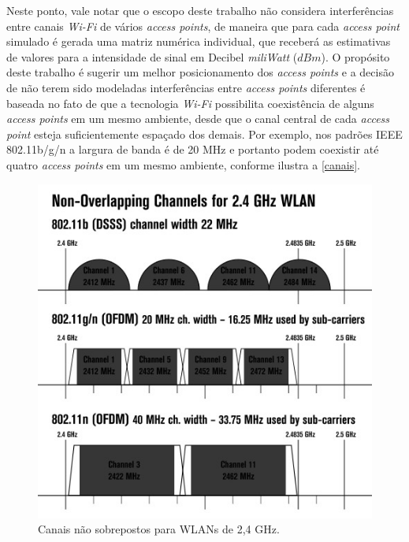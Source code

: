 \documentclass[
	12pt,				%
	twoside,			%
	a4paper,			%
	english,			%
	french,				%
	spanish,			%
	brazil				%
	]{abntex2}
\begin{document}
Neste ponto, vale notar que o escopo deste trabalho não considera
interferências entre canais \emph{Wi-Fi} de vários \emph{access points},
de maneira que para cada \emph{access point} simulado é gerada uma
matriz numérica individual, que receberá as estimativas de valores para
a intensidade de sinal em Decibel \emph{miliWatt} (\(dBm\)). O propósito
deste trabalho é sugerir um melhor posicionamento dos \emph{access
points} e a decisão de não terem sido modeladas interferências entre
\emph{access points} diferentes é baseada no fato de que a tecnologia
\emph{Wi-Fi} possibilita coexistência de alguns \emph{access points} em
um mesmo ambiente, desde que o canal central de cada \emph{access point}
esteja suficientemente espaçado dos demais. Por exemplo, nos padrões
IEEE 802.11b/g/n a largura de banda é de 20 MHz e portanto podem
coexistir até quatro \emph{access points} em um mesmo ambiente, conforme
ilustra a \autoref{canais}.

\begin{figure}[!htb]
    \caption{\label{canais} Canais não sobrepostos para WLANs de 2,4 GHz.}
    \begin{center}
        \includegraphics[scale=0.6]{imagens/canais-1.jpg}
    \end{center}
\end{figure}
\end{document}
